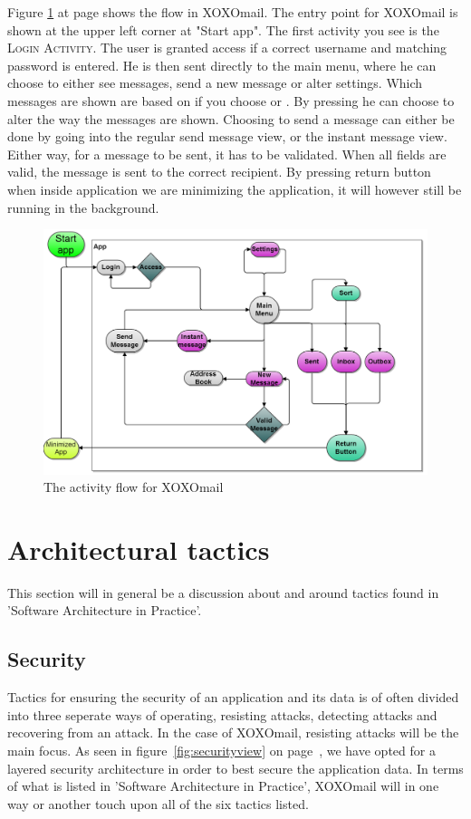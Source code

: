 Figure \ref{fig:logicalGUIview} at page \pageref{fig:logicalGUIview} shows the flow in XOXOmail. The entry point for XOXOmail is shown at the upper left corner at "Start app". The first activity you see is the \textsc{Login Activity}. The user is granted access if a correct username and matching password is entered. He is then sent directly to the main menu, where he can choose to either see messages, send a new message or alter settings. Which messages are shown are based on if you choose  or . By pressing  he can choose to alter the way the messages are shown. Choosing to send a message can either be done by going into the regular send message view, or the instant message view. Either way, for a message to be sent, it has to be validated. When all fields are valid, the message is sent to the correct recipient. By pressing return button when inside application we are minimizing the application, it will however still be running in the background.

\begin{figure}[h!]
	\includegraphics[width=\textwidth]{activities_flowchart3}
	\caption{The activity flow for XOXOmail}
	\label{fig:logicalGUIview}
\end{figure}



\newpage

\section{Architectural tactics}
	This section will in general be a discussion about and around tactics found in 'Software Architecture in Practice'\cite{bib:archi}. 
	\subsection{Security}
		Tactics for ensuring the security of an application and its data is of often divided into three seperate ways of operating, resisting attacks, detecting attacks and recovering from an attack. 
		In the case of XOXOmail, resisting attacks will be the main focus. As seen in figure~\ref{fig:securityview} on page~\pageref{fig:securityview}, we have opted for a layered security architecture in order to best secure the application data. In terms of what is listed in 'Software Architecture in Practice'\cite[p. 119]{bib:archi}, XOXOmail will in one way or another touch upon all of the six tactics listed. 

